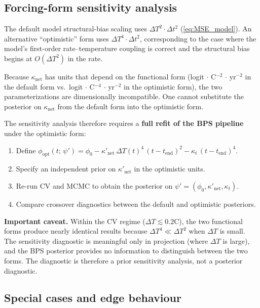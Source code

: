\documentclass[11pt]{article}
\newcommand{\dT}{\Delta T}
\newcommand{\tend}{t_{\mathrm{end}}}
\begin{document}
\subsection{Forcing-form sensitivity analysis}
\label{sec:forcing_form_sensitivity}

The default model structural-bias scaling uses $\dT^2 \cdot \Delta t^2$ (\cref{eq:MSE_model}).  An alternative ``optimistic'' form uses $\dT^4 \cdot \Delta t^2$, corresponding to the case where the model's first-order rate--temperature coupling is correct and the structural bias begins at $O(\dT^2)$ in the rate.

Because $\kappa_{\mathrm{net}}$ has units that depend on the functional form (logit $\cdot$ \textdegree C$^{-2}$ $\cdot$ yr$^{-2}$ in the default form vs.\ logit $\cdot$ \textdegree C$^{-4}$ $\cdot$ yr$^{-2}$ in the optimistic form), the two parameterizations are dimensionally incompatible.  One cannot substitute the posterior on $\kappa_{\mathrm{net}}$ from the default form into the optimistic form.

The sensitivity analysis therefore requires a \textbf{full refit of the BPS pipeline} under the optimistic form:
\begin{enumerate}
  \item Define $\phi_{\mathrm{opt}}(t;\,\psi') = \phi_0 - \kappa'_{\mathrm{net}}\,\dT(t)^4\,(t - \tend)^2 - \kappa_t\,(t - \tend)^4$.
  \item Specify an independent prior on $\kappa'_{\mathrm{net}}$ in the optimistic units.
  \item Re-run CV and MCMC to obtain the posterior on $\psi' = (\phi_0, \kappa'_{\mathrm{net}}, \kappa_t)$.
  \item Compare crossover diagnostics between the default and optimistic posteriors.
\end{enumerate}

\textbf{Important caveat.}  Within the CV regime ($\dT \lesssim 0.2$\textdegree C), the two functional forms produce nearly identical results because $\dT^4 \ll \dT^2$ when $\dT$ is small.  The sensitivity diagnostic is meaningful only in projection (where $\dT$ is large), and the BPS posterior provides no information to distinguish between the two forms.  The diagnostic is therefore a prior sensitivity analysis, not a posterior diagnostic.


\subsection{Special cases and edge behaviour}
\end{document}
